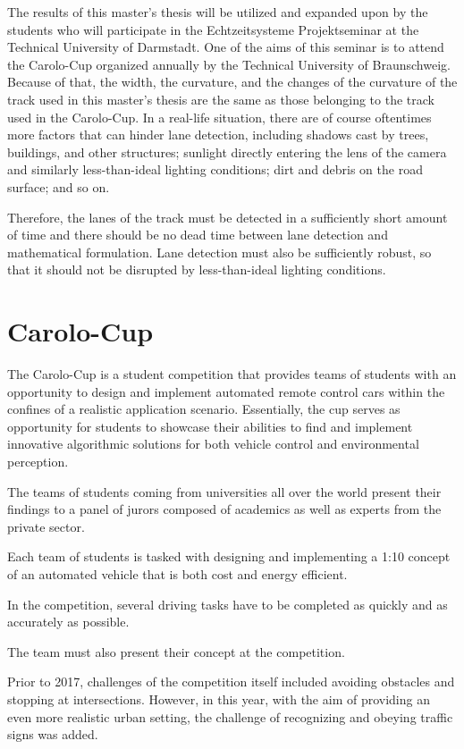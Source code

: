 The results of this master's thesis will be utilized and expanded upon by the students who will participate in the Echtzeitsysteme Projektseminar at the Technical University of Darmstadt. One of the aims of this seminar is to attend the Carolo-Cup organized annually by the Technical University of Braunschweig. Because of that, the width, the curvature, and the changes of the curvature of the track used in this master's thesis are the same as those belonging to the track used in the Carolo-Cup. In a real-life situation, there are of course oftentimes more factors that can hinder lane detection, including shadows cast by trees, buildings, and other structures; sunlight directly entering the lens of the camera and similarly less-than-ideal lighting conditions; dirt and debris on the road surface; and so on.

Therefore, the lanes of the track must be detected in a sufficiently short amount of time and there should be no dead time between lane detection and mathematical 
formulation. Lane detection must also be sufficiently robust, so that it should not be disrupted by less-than-ideal lighting conditions.


\section{Carolo-Cup}\label{sec:Carolo-Cup}

The Carolo-Cup is a student competition that provides teams of students with an opportunity to design and implement automated remote control cars within the confines of a realistic application scenario. Essentially, the cup serves as opportunity for students to showcase their abilities to find and implement innovative algorithmic solutions for both vehicle control and environmental perception. 

The teams of students coming from universities all over the world present their findings to a panel of jurors composed of academics as well as experts from the private sector.

Each team of students is tasked with designing and implementing a 1:10 concept of an automated vehicle that is both cost and energy efficient.

In the competition, several driving tasks have to be completed as quickly and as accurately as possible.

The team must also present their concept at the competition.

Prior to 2017, challenges of the competition itself included avoiding obstacles and stopping at intersections. However, in this year, with the aim of providing an even more realistic urban setting, the challenge of recognizing and obeying traffic signs was added.

